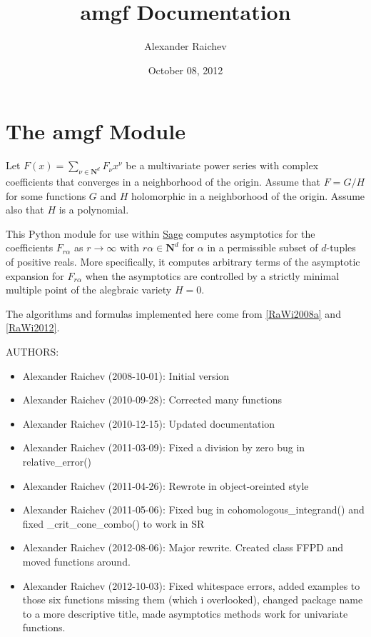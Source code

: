 \documentclass[letterpaper,12pt,openany,oneside]{sphinxmanual}
\title{amgf Documentation}
\date{October 08, 2012}
\author{Alexander Raichev}
\newcommand{\NN}{\Bold{N}}
\newcommand{\Bold}[1]{\mathbf{#1}}
\begin{document}
\maketitle
\tableofcontents
{}\label{index::doc}



\chapter{The amgf Module}
\label{amgf::doc}\label{amgf:module-amgf}\label{amgf:welcome-to-amgf-s-documentation}\label{amgf:the-amgf-module}
Let $F(x) = \sum_{\nu \in \NN^d} F_{\nu} x^\nu$ be a multivariate power series with complex coefficients that converges in a neighborhood of the origin. Assume that $F = G/H$ for some functions $G$ and $H$ holomorphic in a neighborhood of the origin.
Assume also that $H$ is a polynomial.

This Python module for use within \href{http://www.sagemath.org}{Sage} computes asymptotics for the coefficients $F_{r \alpha}$ as $r \to \infty$ with $r \alpha \in \NN^d$ for $\alpha$ in a permissible subset of $d$-tuples of positive reals. 
More specifically, it computes arbitrary terms of the asymptotic expansion for $F_{r \alpha}$ when the asymptotics are controlled by a strictly minimal multiple point of the alegbraic variety $H = 0$.

The algorithms and formulas implemented here come from {\hyperref[amgf:rawi2008a]{{[}RaWi2008a{]}}}
and {\hyperref[amgf:rawi2012]{{[}RaWi2012{]}}}.

AUTHORS:
\begin{itemize}
\item {} 
Alexander Raichev (2008-10-01): Initial version

\item {} 
Alexander Raichev (2010-09-28): Corrected many functions

\item {} 
Alexander Raichev (2010-12-15): Updated documentation

\item {} 
Alexander Raichev (2011-03-09): Fixed a division by zero bug in relative\_error()

\item {} 
Alexander Raichev (2011-04-26): Rewrote in object-oreinted style

\item {} 
Alexander Raichev (2011-05-06): Fixed bug in cohomologous\_integrand() and fixed \_crit\_cone\_combo() to work in SR

\item {} 
Alexander Raichev (2012-08-06): Major rewrite. Created class FFPD and moved functions around.

\item {} 
Alexander Raichev (2012-10-03): Fixed whitespace errors, added examples to those six functions missing them (which i overlooked), changed package name to a more descriptive title, made asymptotics methods work for univariate functions.

\end{itemize}
\end{document}
